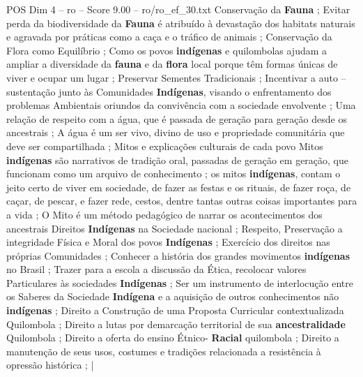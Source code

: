 \begin{textsample}{POS Dim 4 – ro – Score 9.00 – ro/ro\_ef\_30.txt}
Conservação da \textbf{Fauna} ; Evitar perda da biodiversidade da \textbf{Fauna} é atribuído à devastação dos habitats naturais e agravada por práticas como a caça e o tráfico de animais ; Conservação da Flora como Equilíbrio ; Como os povos \textbf{indígenas} e quilombolas ajudam a ampliar a diversidade da \textbf{fauna} e da \textbf{flora} local porque têm formas únicas de viver e ocupar um lugar ; Preservar Sementes Tradicionais ; Incentivar a auto – sustentação junto às Comunidades \textbf{Indígenas}, visando o enfrentamento dos problemas Ambientais oriundos da convivência com a sociedade envolvente ; Uma relação de respeito com a água, que é passada de geração para geração desde os ancestrais ; A água é um ser vivo, divino de uso e propriedade comunitária que deve ser compartilhada ; Mitos e explicações culturais de cada povo Mitos \textbf{indígenas} são narrativos de tradição oral, passadas de geração em geração, que funcionam como um arquivo de conhecimento ; os mitos \textbf{indígenas}, contam o jeito certo de viver em sociedade, de fazer as festas e os rituais, de fazer roça, de caçar, de pescar, e fazer rede, cestos, dentre tantas outras coisas importantes para a vida ; O Mito é um método pedagógico de narrar os acontecimentos dos ancestrais Direitos \textbf{Indígenas} na Sociedade nacional ; Respeito, Preservação a integridade Física e Moral dos povos \textbf{Indígenas} ; Exercício dos direitos nas próprias Comunidades ; Conhecer a história dos grandes movimentos \textbf{indígenas} no Brasil ; Trazer para a escola a discussão da Ética, recolocar valores Particulares às sociedades \textbf{Indígenas} ; Ser um instrumento de interlocução entre os Saberes da Sociedade \textbf{Indígena} e a aquisição de outros conhecimentos não \textbf{indígenas} ; Direito a Construção de uma Proposta Curricular contextualizada Quilombola ; Direito a lutas por demarcação territorial de sua \textbf{ancestralidade} Quilombola ; Direito a oferta do ensino Étnico- \textbf{Racial} quilombola ; Direito a manutenção de seus usos, costumes e tradições relacionada a resistência à opressão histórica ; |

\end{textsample}
